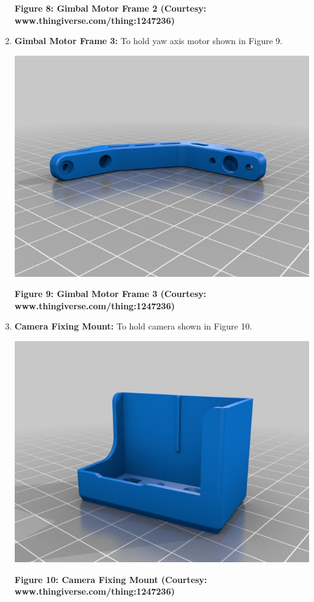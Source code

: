 \documentclass[11pt,a4paper]{article}
\begin{document}
\begin{enumerate}
\begin{center}
			\end{center}
			\begin{center}
				\textbf{Figure 8: Gimbal Motor Frame 2 (Courtesy: www.thingiverse.com/thing:1247236)}
			\end{center}
			\item \textbf{Gimbal Motor Frame 3:} To hold yaw axis motor shown in Figure 9.
			\begin{center}
				\includegraphics[scale=0.5]{../Images/Gimbal_Motor_Frame_3.jpg}
			\end{center}
			\begin{center}
				\textbf{Figure 9: Gimbal Motor Frame 3 (Courtesy: www.thingiverse.com/thing:1247236)}
			\end{center}
			\item \textbf{Camera Fixing Mount:} To hold camera shown in Figure 10.
			\begin{center}
				\includegraphics[scale=0.5]{../Images/Camera_Fixing_Mount.jpg}
			\end{center}
			\begin{center}
				\textbf{Figure 10: Camera Fixing Mount (Courtesy: www.thingiverse.com/thing:1247236)}
			\end{center}
		\end{enumerate}
\end{document}
